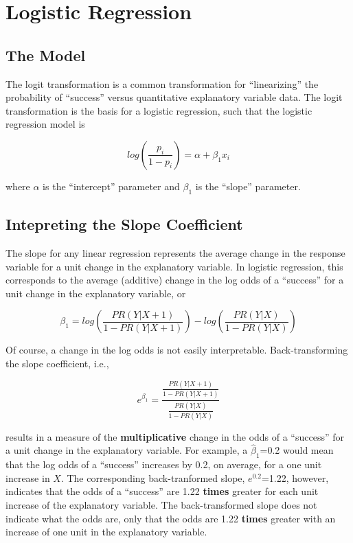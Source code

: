 \documentclass[10pt,openany]{book}\usepackage[]{graphicx}\usepackage[]{color}
\begin{document}
\clearpage
\section{Logistic Regression}
\subsection{The Model}
The logit transformation is a common transformation for ``linearizing'' the probability of ``success'' versus quantitative explanatory variable data.  The logit transformation is the basis for a logistic regression, such that the logistic regression model is

\begin{equation}\label{eqn:logRegModel}
  log\left(\frac{p_{i}}{1-p_{i}}\right) = \alpha + \beta_{1}x_{i}
\end{equation}

where $\alpha$ is the ``intercept'' parameter and $\beta_{1}$ is the ``slope'' parameter.

\subsection{Intepreting the Slope Coefficient}
The slope for any linear regression represents the average change in the response variable for a unit change in the explanatory variable.  In logistic regression, this corresponds to the average (additive) change in the log odds of a ``success'' for a unit change in the explanatory variable, or

\[ \beta_{1} = log\left(\frac{PR(Y|X+1)}{1-PR(Y|X+1)}\right) - log\left(\frac{PR(Y|X)}{1-PR(Y|X)}\right) \]

Of course, a change in the log odds is not easily interpretable.  Back-transforming the slope coefficient, i.e.,

\[ e^{\beta_{1}} = \frac{\frac{PR(Y|X+1)}{1-PR(Y|X+1)}}{\frac{PR(Y|X)}{1-PR(Y|X)}} \]

results in a measure of the \textbf{multiplicative} change in the odds of a ``success'' for a unit change in the explanatory variable.  For example, a $\hat{\beta}_{1}$=0.2 would mean that the log odds of a ``success'' increases by 0.2, on average, for a one unit increase in $X$.  The corresponding back-tranformed slope, $e^{0.2}$=1.22, however, indicates that the odds of a ``success'' are 1.22 \textbf{times} greater for each unit increase of the explanatory variable.  The back-transformed slope does not indicate what the odds are, only that the odds are 1.22 \textbf{times} greater with an increase of one unit in the explanatory variable.
\end{document}
